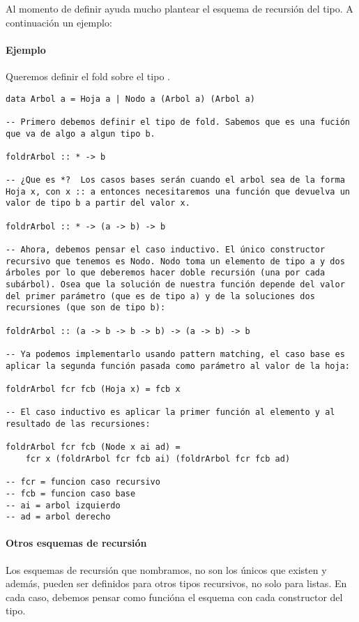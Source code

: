 Al momento de definir  ayuda mucho plantear el esquema de recursión del tipo. A continuación un ejemplo:

\paragraph{Ejemplo} Queremos definir el fold sobre el tipo .

\begin{centrado}
\begin{verbatim}
data Arbol a = Hoja a | Nodo a (Arbol a) (Arbol a)

-- Primero debemos definir el tipo de fold. Sabemos que es una fución que va de algo a algun tipo b.

foldrArbol :: * -> b

-- ¿Que es *?  Los casos bases serán cuando el arbol sea de la forma Hoja x, con x :: a entonces necesitaremos una función que devuelva un valor de tipo b a partir del valor x.

foldrArbol :: * -> (a -> b) -> b

-- Ahora, debemos pensar el caso inductivo. El único constructor recursivo que tenemos es Nodo. Nodo toma un elemento de tipo a y dos árboles por lo que deberemos hacer doble recursión (una por cada subárbol). Osea que la solución de nuestra función depende del valor del primer parámetro (que es de tipo a) y de la soluciones dos recursiones (que son de tipo b):

foldrArbol :: (a -> b -> b -> b) -> (a -> b) -> b

-- Ya podemos implementarlo usando pattern matching, el caso base es aplicar la segunda función pasada como parámetro al valor de la hoja:

foldrArbol fcr fcb (Hoja x) = fcb x 

-- El caso inductivo es aplicar la primer función al elemento y al resultado de las recursiones:

foldrArbol fcr fcb (Node x ai ad) = 
	fcr x (foldrArbol fcr fcb ai) (foldrArbol fcr fcb ad)

-- fcr = funcion caso recursivo
-- fcb = funcion caso base
-- ai = arbol izquierdo
-- ad = arbol derecho
\end{verbatim}
\end{centrado}

\paragraph{Otros esquemas de recursión} Los esquemas de recursión que nombramos, no son los únicos que existen y además, pueden ser definidos para otros tipos recursivos, no solo para listas. En cada caso, debemos pensar como funcióna el esquema con cada constructor del tipo.